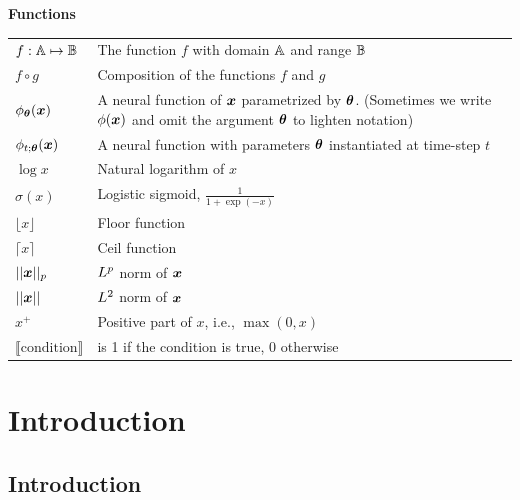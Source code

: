 \documentclass[a4paper,twoside,openright]{book}
\renewcommand\headrulewidth{0pt}
\theoremstyle{plain}
\theoremstyle{definition}
\begin{document}
\centerline{\bf Functions}
\nopagebreak
\begin{tabular}{p{2cm}p{11cm}}
	$\displaystyle f: {\mathbb{A}} \mapsto {\mathbb{B}}$ & The function $f$ with domain ${\mathbb{A}}$ and range ${\mathbb{B}}$\\
	$\displaystyle f \circ g $ & Composition of the functions $f$ and $g$ \\
	$\displaystyle \phi_{\bm{\theta}}({\bm{x}}) $ & A neural function of ${\bm{x}}$ parametrized by ${\bm{\theta}}$.
	(Sometimes we write $\phi({\bm{x}})$ and omit the argument ${\bm{\theta}}$ to lighten notation) \\
	$\displaystyle \phi_{t;{\bm{\theta}}}({\bm{x}}) $ & A neural function with parameters ${\bm{\theta}}$ instantiated at time-step $t$\\
	$\displaystyle \log x$ & Natural logarithm of $x$ \\
	$\displaystyle \sigma(x)$ & Logistic sigmoid, $\displaystyle \frac{1} {1 + \exp(-x)}$ \\
	$\displaystyle \lfloor x \rfloor$ & Floor function\\
	$\displaystyle \lceil x \rceil$ & Ceil function\\
	$\displaystyle || {\bm{x}} ||_p $ & $L^p$ norm of ${\bm{x}}$ \\
	$\displaystyle || {\bm{x}} || $ & $L^2$ norm of ${\bm{x}}$ \\
	$\displaystyle x^+$ & Positive part of $x$, i.e., $\max(0,x)$\\
	$\displaystyle \llbracket\mathrm{condition}\rrbracket$ & is 1 if the condition is true, 0 otherwise\\
\end{tabular}

\tableofcontents


\mainmatter
\fancypagestyle{plain}{
  \fancyfoot{}
  \fancyhead{}
  \renewcommand{\headrulewidth}{0pt}
}

\part*{Introduction}
\label{part:intro}
\chapter{Introduction}
\label{chap:intro}

\end{document}
